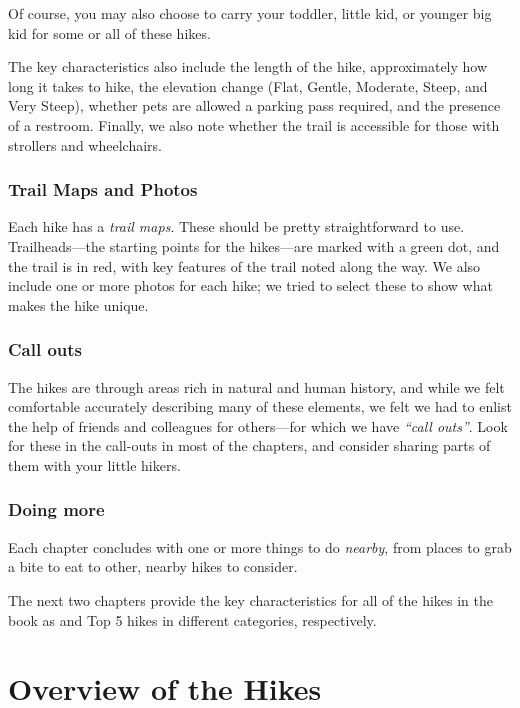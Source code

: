 \documentclass[
  letterpaper,
  DIV=11,
  numbers=noendperiod]{scrreprt}
\begin{document}
Of course, you may also choose to carry your toddler, little kid, or
younger big kid for some or all of these hikes.

The key characteristics also include the length of the hike,
approximately how long it takes to hike, the elevation change (Flat,
Gentle, Moderate, Steep, and Very Steep), whether pets are allowed a
parking pass required, and the presence of a restroom. Finally, we also
note whether the trail is accessible for those with strollers and
wheelchairs.

\subsection{Trail Maps and Photos}\label{trail-maps-and-photos}

Each hike has a \emph{trail maps}. These should be pretty
straightforward to use. Trailheads---the starting points for the
hikes---are marked with a green dot, and the trail is in red, with key
features of the trail noted along the way. We also include one or more
photos for each hike; we tried to select these to show what makes the
hike unique.

\subsection{Call outs}\label{call-outs}

The hikes are through areas rich in natural and human history, and while
we felt comfortable accurately describing many of these elements, we
felt we had to enlist the help of friends and colleagues for
others---for which we have \emph{``call outs''}. Look for these in the
call-outs in most of the chapters, and consider sharing parts of them
with your little hikers.

\subsection{Doing more}\label{doing-more}

Each chapter concludes with one or more things to do \emph{nearby}, from
places to grab a bite to eat to other, nearby hikes to consider.

The next two chapters provide the key characteristics for all of the
hikes in the book as and Top 5 hikes in different categories,
respectively.

\chapter{Overview of the Hikes}\label{overview-of-the-hikes}
\end{document}
